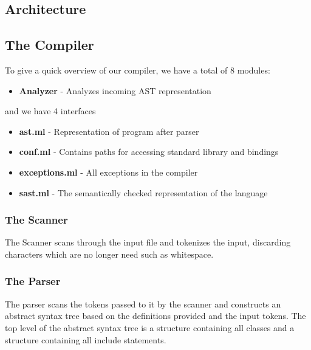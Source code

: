 \begin{homeworkProblem}
	\chapter{Architecture}
	\section{The Compiler}
	To give a quick overview of our compiler, we have a total of 8 modules:
	\begin{itemize}
		\item \textbf{Analyzer} - Analyzes incoming AST representation 
	\end{itemize}
	
	and we have 4 interfaces
	\begin{itemize}
		\item \textbf{ast.ml} - Representation of program after parser
		\item \textbf{conf.ml} - Contains paths for accessing standard library and bindings
		\item \textbf{exceptions.ml} - All exceptions in the compiler
		\item \textbf{sast.ml} - The semantically checked representation of the language
	\end{itemize}
	
	\subsection{The Scanner}
	The Scanner scans through the input file and tokenizes the input, discarding characters which are no longer need such as whitespace.
	
	\subsection{The Parser}
	The parser scans the tokens passed to it by the scanner and constructs an abstract syntax tree based on the definitions provided and the input tokens. The top level of the abstract syntax tree is a structure containing all classes and a structure containing all include statements.
	 

\end{homeworkProblem}
